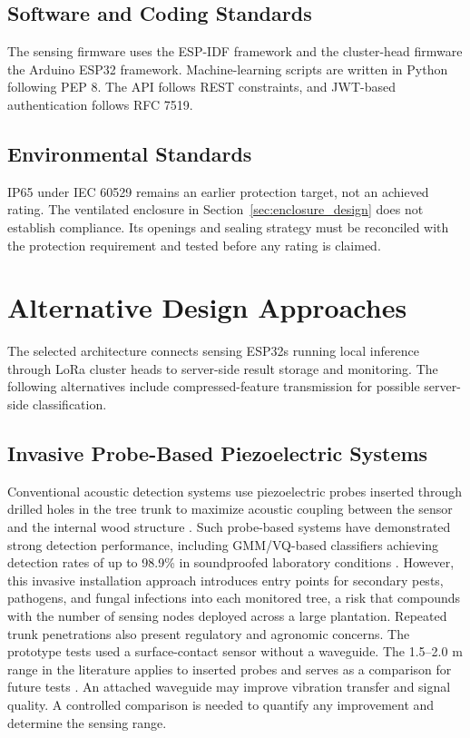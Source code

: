 \documentclass[12pt,a4paper,oneside]{memoir}
\newcommand{\newrevision}[1]{#1}
\begin{document}
\subsection{Software and Coding Standards}

\newrevision{The sensing firmware uses the ESP-IDF framework and the cluster-head firmware the Arduino ESP32 framework. Machine-learning scripts are written in Python following PEP 8. The API follows REST constraints, and JWT-based authentication follows RFC 7519.}

\subsection{Environmental Standards}

\newrevision{IP65 under IEC 60529 remains an earlier protection target, not an achieved rating. The ventilated enclosure in Section~\ref{sec:enclosure_design} does not establish compliance. Its openings and sealing strategy must be reconciled with the protection requirement and tested before any rating is claimed.}

\section{Alternative Design Approaches}

\newrevision{The selected architecture connects sensing ESP32s running local inference through LoRa cluster heads to server-side result storage and monitoring. The following alternatives include compressed-feature transmission for possible server-side classification.}

\subsection{Invasive Probe-Based Piezoelectric Systems}

Conventional acoustic detection systems use piezoelectric probes inserted through drilled holes in the tree trunk to maximize acoustic coupling between the sensor and the internal wood structure \cite{pinhas2008,karar2022}. Such probe-based systems have demonstrated strong detection performance, including GMM/VQ-based classifiers achieving detection rates of up to 98.9\% in soundproofed laboratory conditions \cite{pinhas2008}. However, this invasive installation approach introduces entry points for secondary pests, pathogens, and fungal infections into each monitored tree, a risk that compounds with the number of sensing nodes deployed across a large plantation. Repeated trunk penetrations also present regulatory and agronomic concerns. \newrevision{The prototype tests used a surface-contact sensor without a waveguide. The 1.5--2.0 m range in the literature applies to inserted probes and serves as a comparison for future tests \cite{pinhas2008,karar2022}. An attached waveguide may improve vibration transfer and signal quality. A controlled comparison is needed to quantify any improvement and determine the sensing range.}
\end{document}
